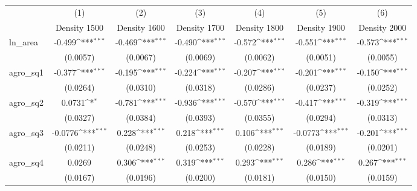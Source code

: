 {
\def\sym#1{\ifmmode^{#1}\else\(^{#1}\)\fi}
\begin{tabular}{l*{6}{c}}
\toprule
                    &\multicolumn{1}{c}{(1)}&\multicolumn{1}{c}{(2)}&\multicolumn{1}{c}{(3)}&\multicolumn{1}{c}{(4)}&\multicolumn{1}{c}{(5)}&\multicolumn{1}{c}{(6)}\\
                    &\multicolumn{1}{c}{Density 1500}&\multicolumn{1}{c}{Density 1600}&\multicolumn{1}{c}{Density 1700}&\multicolumn{1}{c}{Density 1800}&\multicolumn{1}{c}{Density 1900}&\multicolumn{1}{c}{Density 2000}\\
\midrule
ln\_area             &      -0.499\sym{***}&      -0.469\sym{***}&      -0.490\sym{***}&      -0.572\sym{***}&      -0.551\sym{***}&      -0.573\sym{***}\\
                    &    (0.0057)         &    (0.0067)         &    (0.0069)         &    (0.0062)         &    (0.0051)         &    (0.0055)         \\
\addlinespace
agro\_sq1            &      -0.377\sym{***}&      -0.195\sym{***}&      -0.224\sym{***}&      -0.207\sym{***}&      -0.201\sym{***}&      -0.150\sym{***}\\
                    &    (0.0264)         &    (0.0310)         &    (0.0318)         &    (0.0286)         &    (0.0237)         &    (0.0252)         \\
\addlinespace
agro\_sq2            &      0.0731\sym{*}  &      -0.781\sym{***}&      -0.936\sym{***}&      -0.570\sym{***}&      -0.417\sym{***}&      -0.319\sym{***}\\
                    &    (0.0327)         &    (0.0384)         &    (0.0393)         &    (0.0355)         &    (0.0294)         &    (0.0313)         \\
\addlinespace
agro\_sq3            &     -0.0776\sym{***}&       0.228\sym{***}&       0.218\sym{***}&       0.106\sym{***}&     -0.0773\sym{***}&      -0.201\sym{***}\\
                    &    (0.0211)         &    (0.0248)         &    (0.0253)         &    (0.0228)         &    (0.0189)         &    (0.0201)         \\
\addlinespace
agro\_sq4            &      0.0269         &       0.306\sym{***}&       0.319\sym{***}&       0.293\sym{***}&       0.286\sym{***}&       0.267\sym{***}\\
                    &    (0.0167)         &    (0.0196)         &    (0.0200)         &    (0.0181)         &    (0.0150)         &    (0.0159)         \\

\end{tabular}}
